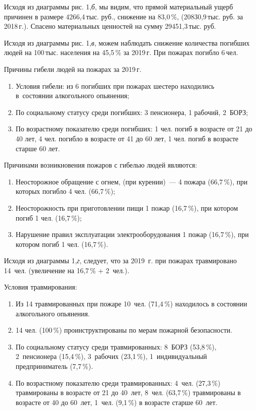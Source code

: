  Исходя из диаграммы рис. 1,\textit{б}, мы видим, что прямой материальный ущерб причинен в размере 4266,4\,тыс. руб., снижение на 83,0\,\%, (20830,9\,тыс. руб. за 2018\,г.). Спасено материальных ценностей на сумму 29451,3\,тыс. руб.

 Исходя из диаграммы рис. 1,\textit{в}, можем наблюдать снижение количества погибших людей на 100\,тыс. населения на 45,5\,\% за 2019\,г. При пожарах погибло 6\,чел.

 Причины гибели людей на пожарах за 2019\,г.
\begin{enumerate}[noitemsep]\vspace{-8pt}
 \item Условия гибели: из 6 погибших при пожарах шестеро находились в~состоянии алкогольного опьянения;
 \item По социальному статусу среди погибших: 3 пенсионера, 1 рабочий, 2~БОРЗ;
 \item По возрастному показателю среди погибших: 1 чел. погиб в возрасте от 21 до 40 лет, 4 чел. погибло в возрасте от 41 до 60 лет, 1 чел. погиб в возрасте старше 60 лет.
\end{enumerate}
\vspace{-6pt}

Причинами возникновения пожаров с гибелью людей являются:
\begin{enumerate}[noitemsep]\vspace{-8pt}
\item Неосторожное обращение с огнем, (при курении)~--- 4 пожара (66,7\,\%), при которых погибло 4 чел. (66,7\,\%);
\item Неосторожность при приготовлении пищи 1 пожар (16,7\,\%), при котором погиб 1 чел. (16,7\,\%);
\item Нарушение правил эксплуатации электрооборудования 1 пожар (16,7\,\%), при котором погиб 1 чел. (16,7\,\%).
\end{enumerate}
\vspace{-6pt}

Исходя из диаграммы 1,\textit{г}, следует, что за 2019~г. при пожарах травмировано 14~чел. (увеличение на 16,7\,\% + 2~чел.).

Условия травмирования:
\begin{enumerate}[noitemsep]\vspace{-8pt}
\item Из 14 травмированных при пожаре 10~чел.  (71,4\,\%) находилось в состоянии алкогольного опьянения.
\item 14 чел. (100\,\%) проинструктированы по мерам пожарной безопасности.
\item По социальному статусу среди травмированных: 8~БОРЗ (53,8\,\%), 2~пенсионера (15,4\,\%), 3~рабочих (23,1\,\%), 1~индивидуальный предприниматель (7,7\,\%).
\item По возрастному показателю среди травмированных: 4~чел. (27,3\,\%) травмированы в возрасте от 21 до 40~лет, 8~чел. (63,7\,\%) травмированы в возрасте от 40 до 60~лет, 1~чел. (9,1\,\%) в возрасте старше 60~лет.
\end{enumerate}
\vspace{-8pt}

